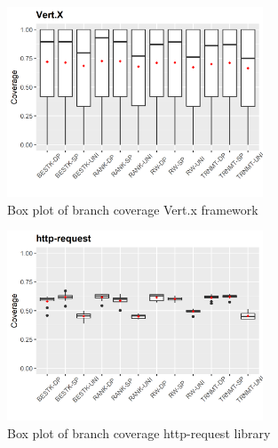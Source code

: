 \documentclass[sigconf]{acmart}
\begin{document}
\begin{figure}[h]
  \centering
  \includegraphics[width=3in]{../output/vertx-boxplot.png}
  \caption{Box plot of branch coverage Vert.x framework}
  \label{fig:boxplot9}
\end{figure}

\begin{figure}[h]
  \centering
  \includegraphics[width=3in]{../output/http-request-boxplot.png}
  \caption{Box plot of branch coverage http-request library}
  \label{fig:boxplot6}
\end{figure}

\clearpage 


\end{document}
